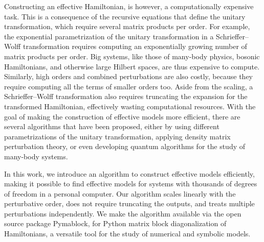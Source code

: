Constructing an effective Hamiltonian, is however, a computationally expensive
task.
This is a consequence of the recursive equations that define the unitary
transformation, which require several matrix products per order.
For example, the exponential parametrization of the unitary
transformation in a Schrieffer--Wolff transformation requires computing
an exponentially growing number of matrix products per order.
Big systems, like those of many-body physics, bosonic Hamiltonians, and
otherwise large Hilbert spaces, are thus expensive to compute.
Similarly, high orders and combined perturbations are also costly, because they
require computing all the terms of smaller orders too.
Aside from the scaling, a Schrieffer--Wolff transformation also requires
truncating the expansion for the transformed Hamiltonian, effectively wasting
computational resources.
With the goal of making the construction of effective models more efficient,
there are several algorithms that have been proposed, either by using different
parametrizations of the unitary transformation, applying density matrix
perturbation theory, or even developing quantum algorithms for the study
of many-body systems.

In this work, we introduce an algorithm to construct effective models
efficiently, making it possible to find effective models for systems with
thousands of degrees of freedom in a personal computer.
Our algorithm scales linearly with the perturbative order, does not require
truncating the outputs, and treats multiple perturbations independently.
We make the algorithm available via the open source package Pymablock, for
Python matrix block diagonalization of Hamiltonians, a versatile tool for
the study of numerical and symbolic models.

